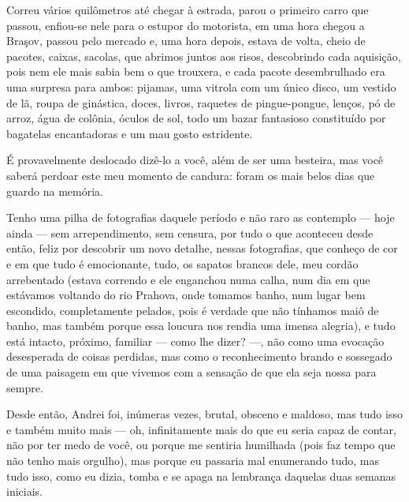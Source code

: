 
Correu vários quilômetros até chegar à estrada, parou o primeiro carro
que passou, enfiou-se nele para o estupor do motorista, em uma hora
chegou a Braşov, passou pelo mercado e, uma hora depois, estava de
volta, cheio de pacotes, caixas, sacolas, que abrimos juntos aos risos,
descobrindo cada aquisição, pois nem ele mais sabia bem o que trouxera,
e cada pacote desembrulhado era uma surpresa para ambos: pijamas, uma
vitrola com um único disco, um vestido de lã, roupa de ginástica, doces,
livros, raquetes de pingue-pongue, lenços, pó de arroz, água de colônia,
óculos de sol, todo um bazar fantasioso constituído por bagatelas
encantadoras e um mau gosto estridente.

É provavelmente deslocado dizê-lo a você, além de ser uma besteira, mas
você saberá perdoar este meu momento de candura: foram os mais belos
dias que guardo na memória.

Tenho uma pilha de fotografias daquele período e não raro as contemplo
--- hoje ainda --- sem arrependimento, sem censura, por tudo o que
aconteceu desde então, feliz por descobrir um novo detalhe, nessas
fotografias, que conheço de cor e em que tudo é emocionante, tudo, os
sapatos brancos dele, meu cordão arrebentado (estava correndo e ele
enganchou numa calha, num dia em que estávamos voltando do rio Prahova,
onde tomamos banho, num lugar bem escondido, completamente pelados, pois
é verdade que não tínhamos maiô de banho, mas também porque essa loucura
nos rendia uma imensa alegria), e tudo está intacto, próximo, familiar ---
como lhe dizer? ---, não como uma evocação desesperada de coisas
perdidas, mas como o reconhecimento brando e sossegado de uma paisagem
em que vivemos com a sensação de que ela seja nossa para sempre.

Desde então, Andrei foi, inúmeras vezes, brutal, obsceno e maldoso, mas
tudo isso e também muito mais --- oh, infinitamente mais do que eu seria
capaz de contar, não por ter medo de você, ou porque me sentiria
humilhada (pois faz tempo que não tenho mais orgulho), mas porque eu
passaria mal enumerando tudo, mas tudo isso, como eu dizia, tomba e se
apaga na lembrança daquelas duas semanas iniciais.

